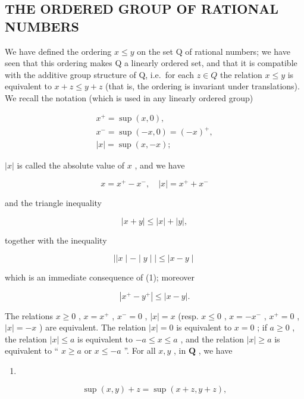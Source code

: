 \subsection{THE ORDERED GROUP OF RATIONAL NUMBERS}

We have defined the ordering \(x \leqslant y\) on the set Q of rational numbers; we have seen that this ordering makes Q a linearly ordered set, and that it is compatible with the additive group structure of Q, i.e.~for each \(z \in Q\) the relation \(x \leqslant y\) is equivalent to \(x + z \leqslant y + z\) (that is, the ordering is invariant under translations). We recall the notation (which is used in any linearly ordered group)

\[
\begin{array}{l} x ^ {+} = \sup (x, 0), \\ x ^ {-} = \sup (- x, 0) = (- x) ^ {+}, \\ | x | = \sup (x, - x); \end{array}
\]

\(|x|\) is called the absolute value of \(x\) , and we have

\[
x = x ^ {+} - x ^ {-}, \quad | x | = x ^ {+} + x ^ {-}
\]

and the triangle inequality

\[
| x + y | \leqslant | x | + | y |,\tag{1}
\]

together with the inequality

\[
\mid | x \mid - \mid y \mid \mid \leqslant \mid x - y \mid\tag{2}
\]

which is an immediate consequence of (1); moreover

\[
\left| x ^ {+} - y ^ {+} \right| \leqslant | x - y |.\tag{3}
\]

The relations \(x \geqslant 0\) , \(x = x^{+}\) , \(x^{-} = 0\) , \(|x| = x\) (resp. \(x \leqslant 0\) , \(x = -x^{-}\) , \(x^{+} = 0\) , \(|x| = -x\) ) are equivalent. The relation \(|x| = 0\) is equivalent to \(x = 0\) ; if \(a \geqslant 0\) , the relation \(|x| \leqslant a\) is equivalent to \(-a \leqslant x \leqslant a\) , and the relation \(|x| \geqslant a\) is equivalent to `` \(x \geqslant a\) or \(x \leqslant -a\) ''. For all \(x, y\) , in \(\mathbf{Q}\) , we have

\begin{enumerate}
\def\labelenumi{(\arabic{enumi})}
\setcounter{enumi}{3}
\tightlist
\item
\end{enumerate}

\[
\sup (x, y) + z = \sup (x + z, y + z),\tag{4}
\]

